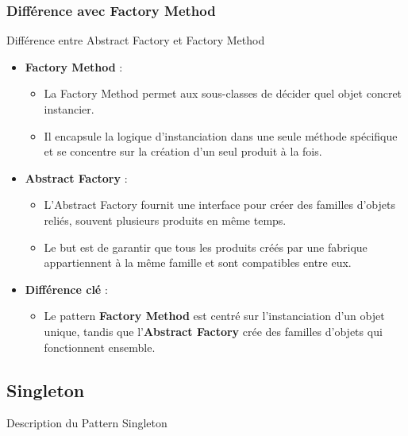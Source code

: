 \documentclass[aspectratio=169]{beamer}
\begin{document}
  \subsubsection{Différence avec Factory Method}

  \begin{frame}{Différence entre Abstract Factory et Factory Method}
    \begin{itemize}
        \item \textbf{Factory Method} :
        \begin{itemize}
            \item La Factory Method permet aux sous-classes de décider quel objet concret instancier.
            \item Il encapsule la logique d'instanciation dans une seule méthode spécifique et se concentre sur la création d'un seul produit à la fois.
        \end{itemize}
        \item \textbf{Abstract Factory} :
        \begin{itemize}
            \item L'Abstract Factory fournit une interface pour créer des familles d'objets reliés, souvent plusieurs produits en même temps.
            \item Le but est de garantir que tous les produits créés par une fabrique appartiennent à la même famille et sont compatibles entre eux.
        \end{itemize}
        \item \textbf{Différence clé} :
        \begin{itemize}
            \item Le pattern \textbf{Factory Method} est centré sur l'instanciation d'un objet unique, tandis que l'\textbf{Abstract Factory} crée des familles d'objets qui fonctionnent ensemble.
        \end{itemize}
    \end{itemize}
  \end{frame}

  \subsection{Singleton}
  \begin{frame}{Description du Pattern Singleton}
  \end{frame}
\end{document}
